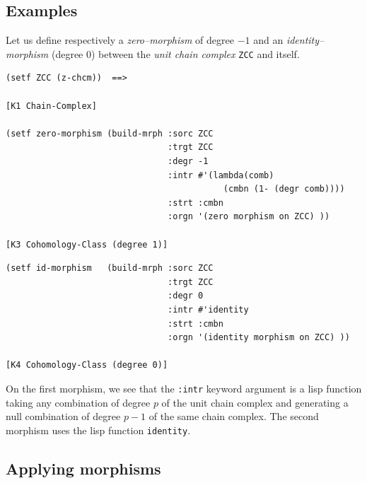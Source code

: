 \subsection*{Examples}

Let us define respectively a {\em zero--morphism} of degree $-1$
and an {\em identity--morphism} (degree $0$)  between  the {\em unit chain complex} {\tt ZCC} and itself.
{\footnotesize\begin{verbatim}
(setf ZCC (z-chcm))  ==>

[K1 Chain-Complex]

(setf zero-morphism (build-mrph :sorc ZCC
                                :trgt ZCC
                                :degr -1
                                :intr #'(lambda(comb)
                                           (cmbn (1- (degr comb)))) 
                                :strt :cmbn
                                :orgn '(zero morphism on ZCC) ))

[K3 Cohomology-Class (degree 1)]
\end{verbatim}}
\newpage
{\footnotesize\begin{verbatim}
(setf id-morphism   (build-mrph :sorc ZCC
                                :trgt ZCC
                                :degr 0
                                :intr #'identity
                                :strt :cmbn
                                :orgn '(identity morphism on ZCC) ))

[K4 Cohomology-Class (degree 0)]
\end{verbatim}}
On the first morphism, we see that the  {\tt :intr} keyword argument is a lisp function
taking any combination of degree $p$ of the  unit chain complex and generating a null 
combination of degree $p-1$ of the same chain complex. The second morphism uses the lisp 
function {\tt identity}.

\subsection{Applying morphisms}

